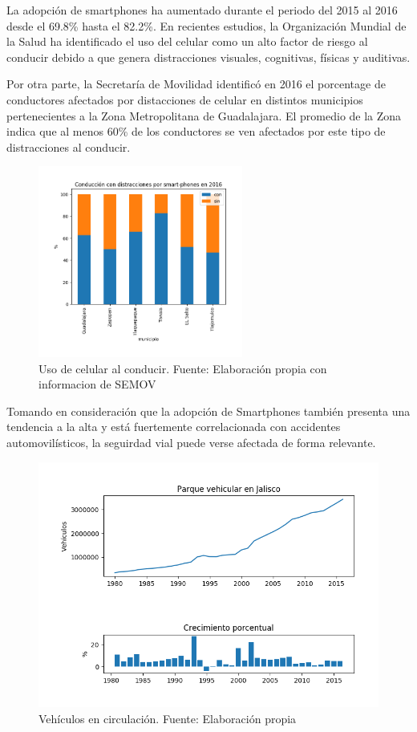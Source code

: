 \documentclass{article}
\begin{document}
La adopción de smartphones ha aumentado durante el periodo del 2015 al 2016 desde
el 69.8\% hasta el 82.2\%. En recientes estudios, la Organización Mundial de la Salud ha identificado
el uso del celular como un alto factor de riesgo al conducir debido a que genera distracciones
visuales, cognitivas, físicas y auditivas.

Por otra parte, la Secretaría de Movilidad identificó en 2016 el porcentage de conductores afectados
por distacciones de celular en distintos municipios pertenecientes a la Zona Metropolitana de Guadalajara.
El promedio de la Zona indica que al menos 60\% de los conductores se ven afectados por este tipo
de distracciones al conducir.

	\begin{figure}[H]\centering
	\includegraphics[width=0.6\textwidth]{resources/img/manejo_con_celular.png}
	\caption{\label{fig:manejo_celular} Uso de celular al conducir. Fuente: Elaboración propia con informacion de SEMOV}
    \end{figure}

Tomando en consideración que la adopción de Smartphones
también presenta una tendencia a la alta y está fuertemente correlacionada con accidentes automovilísticos,
la seguirdad vial puede verse afectada de forma relevante.

	\begin{figure}[H]\centering
	\includegraphics[width=1\textwidth]{resources/img/parque_vehicular.png}
	\caption{\label{fig:parque_vehicular} Vehículos en circulación. Fuente: Elaboración propia}
    \end{figure}
\end{document}
